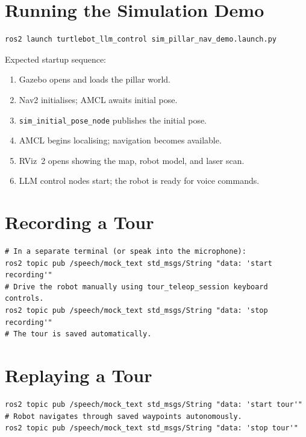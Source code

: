 \documentclass[12pt,a4paper]{report}
\newcommand{\node}[1]{\texttt{\color{Maroon}#1}}
\begin{document}
\section{Running the Simulation Demo}

\begin{lstlisting}[style=bashstyle, caption={Launch simulation in one command}]
ros2 launch turtlebot_llm_control sim_pillar_nav_demo.launch.py
\end{lstlisting}

Expected startup sequence:

\begin{enumerate}[leftmargin=2em]
  \item Gazebo opens and loads the pillar world.
  \item Nav2 initialises; AMCL awaits initial pose.
  \item \node{sim\_initial\_pose\_node} publishes the initial pose.
  \item AMCL begins localising; navigation becomes available.
  \item RViz~2 opens showing the map, robot model, and laser scan.
  \item LLM control nodes start; the robot is ready for voice commands.
\end{enumerate}

\section{Recording a Tour}

\begin{lstlisting}[style=bashstyle, caption={Start a recording session (voice commands)}]
# In a separate terminal (or speak into the microphone):
ros2 topic pub /speech/mock_text std_msgs/String "data: 'start recording'"
# Drive the robot manually using tour_teleop_session keyboard controls.
ros2 topic pub /speech/mock_text std_msgs/String "data: 'stop recording'"
# The tour is saved automatically.
\end{lstlisting}

\section{Replaying a Tour}

\begin{lstlisting}[style=bashstyle]
ros2 topic pub /speech/mock_text std_msgs/String "data: 'start tour'"
# Robot navigates through saved waypoints autonomously.
ros2 topic pub /speech/mock_text std_msgs/String "data: 'stop tour'"
\end{lstlisting}
\end{document}
